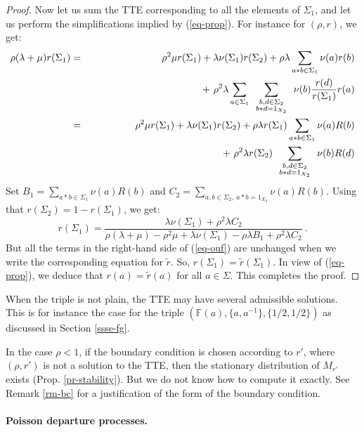 \documentclass[11pt,a4paper]{article}
\newcommand{\bdl}[2]
{\mbox{$
\renewcommand{\arraystretch}{0.5}
\begin{array}{c}{\scriptstyle #1}\\ {\scriptstyle #2} \end{array}
\renewcommand{\arraystretch}{2}
       $}}
\theoremstyle{remark}
\def\Blackboardfont{\mathbb}
\def\F{{\Blackboardfont F}}
\def\eref#1{(\ref{#1})}
\begin{document}
\begin{proof}
Now let us sum the TTE corresponding to all the elements of
$\Sigma_1$, and let us perform the simplifications implied by
\eref{eq-prop}. For instance for $(\rho,r)$, we get:
\begin{eqnarray*}
\rho(\lambda+\mu) r(\Sigma_1) & = &  \rho^2 \mu r(\Sigma_1) +
\lambda \nu(\Sigma_1) r(\Sigma_2) + \rho\lambda \sum_{a \ast b\in
\Sigma_1}
 \nu(a)r(b) \\
&& \hspace*{4cm} + \ \rho^2 \lambda \sum_{a\in \Sigma_1}
\sum_{\bdl{b,d\in \Sigma_2}{b\ast
     d=1_{X_2}}} \nu(b)\frac{r(d)}{r(\Sigma_1)}r(a)  \\
 & = &  \rho^2 \mu r(\Sigma_1) + \lambda
\nu(\Sigma_1) r(\Sigma_2) + \rho\lambda r(\Sigma_1)\sum_{a \ast
b\in
  \Sigma_1}  \nu(a)R(b) \\
&& \hspace*{4cm} + \ \rho^2 \lambda r(\Sigma_2) \sum_{\bdl{b,d\in
\Sigma_2}{b\ast
     d=1_{X_2}}} \nu(b) R(d)
\end{eqnarray*}
Set $B_1 = \sum_{a \ast b\in
  \Sigma_1}  \nu(a)R(b)$ and $C_2= \sum_{a,b\in \Sigma_2, \ a\ast
     b=1_{X_2}} \nu(a) R(b)$.
Using that $r(\Sigma_2)=1-r(\Sigma_1)$, we get:
\begin{equation}\label{eq-ouf}
r(\Sigma_1)  =  \frac{\lambda\nu(\Sigma_1) + \rho^2\lambda
  C_2}{\rho(\lambda+\mu) -\rho^2\mu + \lambda \nu(\Sigma_1) -\rho
  \lambda B_1 +\rho^2\lambda C_2} \:.
\end{equation}
But all the terms in the right-hand side of \eref{eq-ouf} are
unchanged when we write the corresponding equation for $\tilde{r}$.
So, $r(\Sigma_1)=\tilde{r}(\Sigma_1)$. In view of \eref{eq-prop}, we
deduce that $r(a)=\tilde{r}(a)$ for all $a\in \Sigma$.
This completes the proof. 
\end{proof}

When the triple is not plain, the TTE may have several
admissible solutions. This is for instance the case for the triple
$(\F(a),\{a,a^{-1}\},\{1/2,1/2\})$ as discussed in Section
\ref{ssse-fg}. 

\remark In the case $\rho<1$, if the boundary condition is chosen
according to $r'$, where $(\rho,r')$ is not a solution to the TTE,
then the stationary distribution of $M_{r'}$ exists
(Prop. \ref{pr-stability}). But we do not know 
how to compute it exactly. 
See Remark \ref{rm-bc} for a
justification of the form of the boundary condition. 




\paragraph{Poisson departure processes.} $ $ \\
\end{document}
